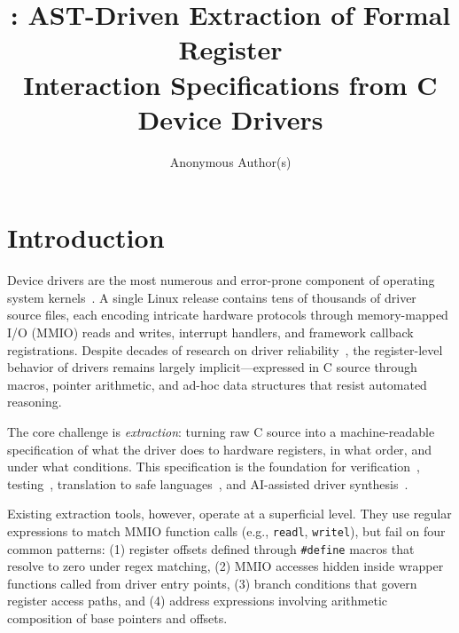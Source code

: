 \documentclass[sigplan, screen, review, anonymous]{acmart}
\title{\reharness: AST-Driven Extraction of Formal Register\\Interaction Specifications from C Device Drivers}
\author{Anonymous Author(s)}
\affiliation{%
  \institution{Anonymous Institution}
  \city{Anonymous City}
  \country{Anonymous Country}
}
\begin{document}
\maketitle

\section{Introduction}

Device drivers are the most numerous and error-prone component of operating system kernels~\cite{chou2001empirical,swift2003improving}. A single Linux release contains tens of thousands of driver source files, each encoding intricate hardware protocols through memory-mapped I/O (MMIO) reads and writes, interrupt handlers, and framework callback registrations. Despite decades of research on driver reliability~\cite{ball2006thorough,ryzhyk2009dingo,kadav2009tolerating}, the register-level behavior of drivers remains largely implicit---expressed in C source through macros, pointer arithmetic, and ad-hoc data structures that resist automated reasoning.

The core challenge is \emph{extraction}: turning raw C source into a machine-readable specification of what the driver does to hardware registers, in what order, and under what conditions. This specification is the foundation for verification~\cite{witkowski2007automated}, testing~\cite{cadar2008klee}, translation to safe languages~\cite{emrath2021c2rust}, and AI-assisted driver synthesis~\cite{roelofs2023large}.

Existing extraction tools, however, operate at a superficial level. They use regular expressions to match MMIO function calls (e.g., \texttt{readl}, \texttt{writel}), but fail on four common patterns: (1) register offsets defined through \texttt{\#define} macros that resolve to zero under regex matching, (2) MMIO accesses hidden inside wrapper functions called from driver entry points, (3) branch conditions that govern register access paths, and (4) address expressions involving arithmetic composition of base pointers and offsets.
\end{document}
